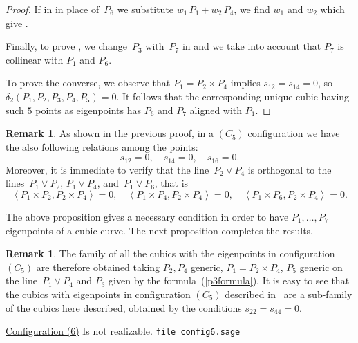 \documentclass{amsart}
\theoremstyle{plain}
\theoremstyle{definition}
\newtheorem{rmk}[lemma]{Remark}
\newcommand{\scl}[2]{\left\langle {#1}, {#2} \right\rangle}
\begin{document}
\begin{proof}
If in  in place of~$P_6$ we substitute $w_1 \, P_1 + w_2 \, P_4$,
we find $w_1$ and $w_2$ which give .

Finally, to prove , we change~$P_3$ with~$P_7$ in  and we take into account that $P_7$ is collinear with $P_1$ and $P_6$.


To prove the converse, we observe that $P_1= P_2 \times P_4$ implies
$s_{12}=s_{14}=0$, so $\delta_2 (P_1,P_2,P_3,P_4,P_5)=0$. It follows that the corresponding unique cubic having such $5$ points as eigenpoints has $P_6$ and $P_7$ aligned with $P_1$.
\end{proof}

\begin{rmk}
As shown in the previous proof,
in a $(C_5)$ configuration we
have the also following relations among the points:
%
\[
  s_{12} = 0, \quad s_{14} = 0, \quad s_{16} = 0.
\]
%
Moreover, it is
immediate to verify that the line~$P_2 \vee P_4$ is orthogonal to the
lines~$P_1 \vee P_2$, $P_1 \vee P_4$, and~$P_1 \vee P_6$, that is
%
\[
  \scl{P_1 \times P_2}{P_2 \times P_4} = 0, \quad
  \scl{P_1 \times P_4}{P_2 \times P_4} = 0, \quad
  \scl{P_1 \times P_6}{P_2 \times P_4} = 0.
\]
%
\end{rmk}

The above proposition gives a necessary condition in order to have
$P_1, \dots, P_7$ eigenpoints of a cubic curve. The next proposition
completes the results.

\begin{rmk}
The family of all the cubics with the eigenpoints in configuration $(C_5)$
are therefore obtained taking $P_2, P_4$ generic, $P_1 = P_2 \times P_4$,
$P_5$ generic on the line~$P_1 \vee P_4$ and $P_3$ given by the
formula~(\ref{p3formula}).
It is easy to see that the cubics with eigenpoints in configuration $(C_5)$
described in~ are a sub-family of the cubics here described,
obtained by the conditions $s_{22} = s_{44} = 0$.
\end{rmk}


\underline{Configuration (6)} Is not realizable.
\verb+file config6.sage+

\end{document}

